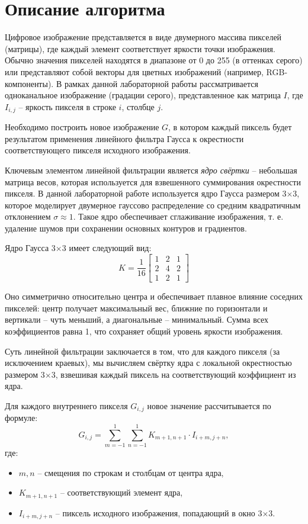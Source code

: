 \documentclass[14pt, a4paper]{extarticle}
\begin{document}
\newpage

\section{Описание алгоритма}

Цифровое изображение представляется в виде двумерного массива пикселей (матрицы), где каждый элемент соответствует яркости точки изображения. Обычно значения пикселей находятся в диапазоне от 0 до 255 (в оттенках серого) или представляют собой векторы для цветных изображений (например, RGB-компоненты). В рамках данной лабораторной работы рассматривается одноканальное изображение (градации серого), представленное как матрица  $I$, где  $I_{i,j}$ – яркость пикселя в строке $i$, столбце $j$.

Необходимо построить новое изображение $G$, в котором каждый пиксель будет результатом применения линейного фильтра Гаусса к окрестности соответствующего пикселя исходного изображения.

Ключевым элементом линейной фильтрации является \textit{ядро свёртки} – небольшая матрица весов, которая используется для взвешенного суммирования окрестности пикселя. В данной лабораторной работе используется ядро Гаусса размером 3×3, которое моделирует двумерное гауссово распределение со средним квадратичным отклонением $\sigma \approx 1$. Такое ядро обеспечивает сглаживание изображения, т. е. удаление шумов при сохранении основных контуров и градиентов.

Ядро Гаусса 3×3 имеет следующий вид:
\[
K = \frac{1}{16}
\begin{bmatrix}
1 & 2 & 1 \\
2 & 4 & 2 \\
1 & 2 & 1
\end{bmatrix}
\]

Оно симметрично относительно центра и обеспечивает плавное влияние соседних пикселей: центр получает максимальный вес, ближние по горизонтали и вертикали – чуть меньший, а диагональные – минимальный. Сумма всех коэффициентов равна 1, что сохраняет общий уровень яркости изображения.

Суть линейной фильтрации заключается в том, что для каждого пикселя (за исключением краевых), мы вычисляем свёртку ядра с локальной окрестностью размером 3×3, взвешивая каждый пиксель на соответствующий коэффициент из ядра.

Для каждого внутреннего пикселя $G_{i,j}$ новое значение рассчитывается по формуле:
\[
G_{i,j} = \sum_{m=-1}^{1} \sum_{n=-1}^{1} K_{m+1,n+1} \cdot I_{i+m,j+n},
\]
где:
\begin{itemize}
  \item $m, n$ – смещения по строкам и столбцам от центра ядра,
  \item $K_{m+1,n+1}$ – соответствующий элемент ядра,
  \item $I_{i+m,j+n}$ – пиксель исходного изображения, попадающий в окно 3×3.
\end{itemize}
\end{document}
